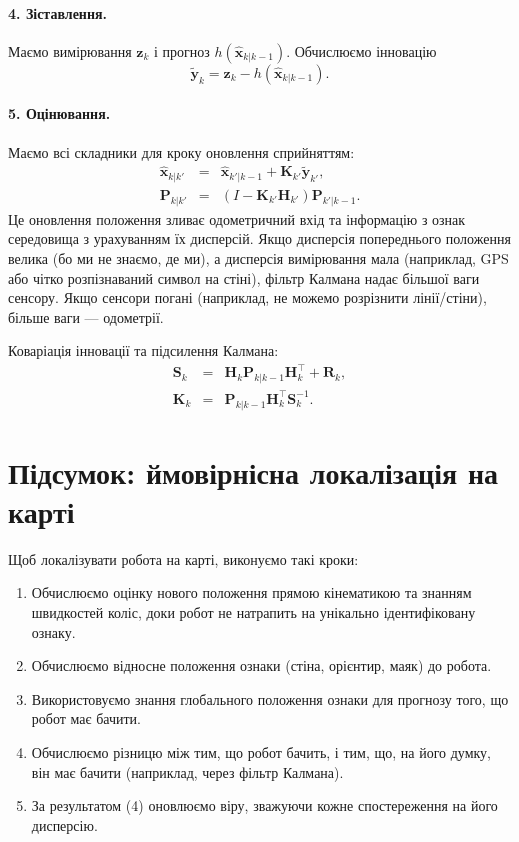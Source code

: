\paragraph{4. Зіставлення.}
Маємо вимірювання $\boldsymbol{z}_k$ і прогноз $h(\hat{\boldsymbol{x}}_{k|k-1})$. Обчислюємо інновацію
\begin{equation}
\tilde{\boldsymbol{y}}_{k}=\boldsymbol{z}_{k}-h(\hat{\boldsymbol{x}}_{k|k-1}).
\end{equation}

\paragraph{5. Оцінювання.}
Маємо всі складники для кроку оновлення сприйняттям:
\begin{eqnarray}
\hat{\boldsymbol{x}}_{k|k'} &=& \hat{\boldsymbol{x}}_{k'|k-1} + \boldsymbol{K}_{k'}\tilde{\boldsymbol{y}}_{k'},\\
\boldsymbol{P}_{k|k'} &=& (I - \boldsymbol{K}_{k'} \boldsymbol{H}_{k'}) \boldsymbol{P}_{k'|k-1}.
\end{eqnarray}
Це оновлення положення зливає одометричний вхід та інформацію з ознак середовища з урахуванням їх дисперсій. Якщо дисперсія попереднього положення велика (бо ми не знаємо, де ми), а дисперсія вимірювання мала (наприклад, GPS або чітко розпізнаваний символ на стіні), фільтр Калмана надає більшої ваги сенсору. Якщо сенсори погані (наприклад, не можемо розрізнити лінії/стіни), більше ваги — одометрії.

Коваріація інновації та підсилення Калмана:
\begin{eqnarray}
\boldsymbol{S}_{k}&=&\boldsymbol{H}_{k}\boldsymbol{P}_{k|k-1}\boldsymbol{H}_{k}^\top + \boldsymbol{R}_{k},\\
\boldsymbol{K}_{k}&=&\boldsymbol{P}_{k|k-1}\boldsymbol{H}_{k}^\top \boldsymbol{S}_{k}^{-1}.
\end{eqnarray}

\section{Підсумок: ймовірнісна локалізація на карті}\label{sec:pmbl}
Щоб локалізувати робота на карті, виконуємо такі кроки:
\begin{enumerate}
\item Обчислюємо оцінку нового положення прямою кінематикою та знанням швидкостей коліс, доки робот не натрапить на унікально ідентифіковану ознаку.
\item Обчислюємо відносне положення ознаки (стіна, орієнтир, маяк) до робота.
\item Використовуємо знання глобального положення ознаки для прогнозу того, що робот має бачити.
\item Обчислюємо різницю між тим, що робот бачить, і тим, що, на його думку, він має бачити (наприклад, через фільтр Калмана).
\item За результатом (4) оновлюємо віру, зважуючи кожне спостереження на його дисперсію.
\end{enumerate}

